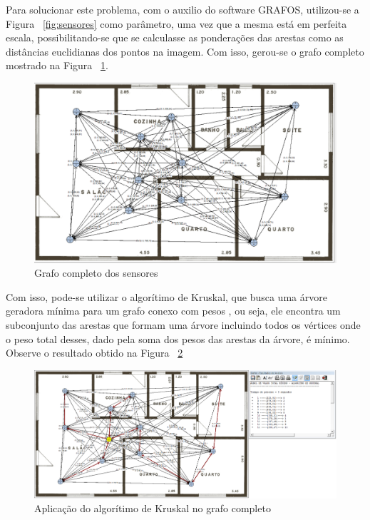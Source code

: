 \documentclass[a4paper,12pt]{article}
\begin{document}
Para solucionar este problema, com o auxilio do software GRAFOS, utilizou-se a Figura ~\ref{fig:sensores} como parâmetro, uma vez que a mesma está em perfeita escala, possibilitando-se que se calculasse as ponderações das arestas como as distâncias euclidianas dos pontos na imagem. Com isso, gerou-se o grafo completo mostrado na Figura ~\ref{fig:sensorescompleto}.

\begin{figure}[H]
	\begin{center}
		\includegraphics[width=0.8\linewidth]{sensorescompleto.png}
	\end{center}
	\caption{Grafo completo dos sensores}
	\label{fig:sensorescompleto}
\end{figure}

Com isso, pode-se utilizar o algorítimo de Kruskal, que busca uma árvore geradora mínima para um grafo conexo com pesos \cite{kruskal1990complexity}, ou seja, ele encontra um subconjunto das arestas que formam uma árvore incluindo todos os vértices onde o peso total desses, dado pela soma dos pesos das arestas da árvore, é mínimo. Observe o resultado obtido na Figura ~\ref{fig:sensoresconclusao}

\begin{figure}[H]
	\hspace{-1cm}
	\includegraphics[width=1.2\linewidth]{sensoresconclusao.png}
	\caption{Aplicação do algorítimo de Kruskal no grafo completo}
	\label{fig:sensoresconclusao}
\end{figure}
\end{document}

